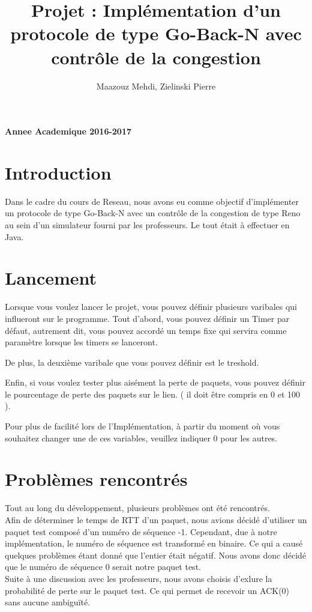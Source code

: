 \documentclass[a4paper,10pt]{article}
\title{Projet : Implémentation d'un protocole de type Go-Back-N avec contrôle de la congestion}
\author{Maazouz Mehdi, Zielinski Pierre}
\begin{document}
\maketitle
\textbf{Annee Academique 2016-2017}\\
\tableofcontents
\newpage

\section{Introduction}
Dans le cadre du cours de Reseau, nous avons eu comme objectif d'implémenter un protocole de type Go-Back-N
avec un contrôle de la congestion de type Reno au sein d'un simulateur fourni par les professeurs. Le tout était 
à effectuer en Java.

\section{Lancement}
Lorsque vous voulez lancer le projet, vous pouvez définir plusieurs varibales qui influeront sur le programme.
Tout d'abord, vous pouvez définir un Timer par défaut, autrement dit, vous pouvez accordé un temps fixe qui servira
comme paramètre lorsque les timers se lanceront.

De plus, la deuxième varibale que vous pouvez définir est le treshold.

Enfin, si vous voulez tester plus aisément la perte de paquets, vous pouvez définir le pourcentage de perte des paquets sur le lien.
( il doit être compris en 0 et 100 ).

Pour plus de facilité lors de l'Implémentation, à partir du moment où vous souhaitez changer une de ces variables, veuillez indiquer 0 pour les
autres.

\section{Problèmes rencontrés}
Tout au long du développement, plusieurs problèmes ont été rencontrés.\\
Afin de déterminer le temps de RTT d'un paquet, nous avions décidé d'utiliser un paquet test composé d'un numéro de séquence -1.
Cependant, due à notre implémentation, le numéro de séquence est transformé en binaire. Ce qui a causé quelques problèmes étant donné
que l'entier était négatif. Nous avons donc décidé que le numéro de séquence 0 serait notre paquet test.
\\
Suite à une discussion avec les professeurs, nous avons choisis d'exlure la probabilité de perte sur le paquet test.
Ce qui permet de recevoir un ACK(0) sans aucune ambiguïté.
\end{document}
